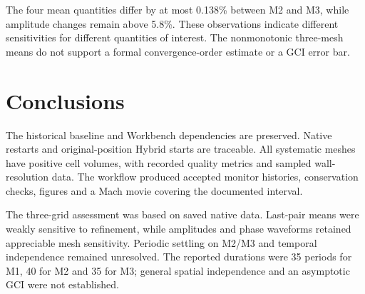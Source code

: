 \documentclass[11pt,a4paper]{article}
\begin{document}
The four mean quantities differ by at most 0.138\% between M2 and M3, while amplitude changes remain above 5.8\%. These observations indicate different sensitivities for different quantities of interest. The nonmonotonic three-mesh means do not support a formal convergence-order estimate or a GCI error bar.\par

\FloatBarrier
\section{Conclusions}
The historical baseline and Workbench dependencies are preserved. Native restarts and original-position Hybrid starts are traceable. All systematic meshes have positive cell volumes, with recorded quality metrics and sampled wall-resolution data. The workflow produced accepted monitor histories, conservation checks, figures and a Mach movie covering the documented interval.\par

The three-grid assessment was based on saved native data. Last-pair means were weakly sensitive to refinement, while amplitudes and phase waveforms retained appreciable mesh sensitivity. Periodic settling on M2/M3 and temporal independence remained unresolved. The reported durations were 35 periods for M1, 40 for M2 and 35 for M3; general spatial independence and an asymptotic GCI were not established.\par

\FloatBarrier
\appendix
\end{document}
